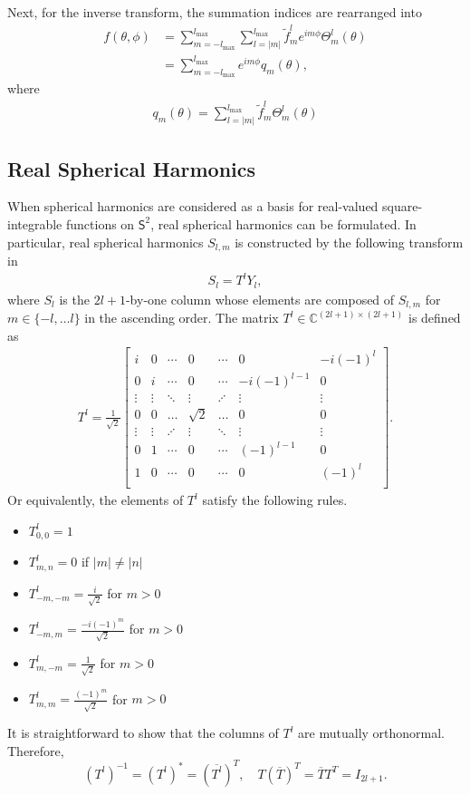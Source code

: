 \documentclass[onecolumn,11pt]{IEEEtran}
\newcommand{\Cp}{\ensuremath{\mathbb{C}}}
\newcommand{\Sph}{\ensuremath{\mathsf{S}}}
\begin{document}
Next, for the inverse transform, the summation indices are rearranged into
\begin{align*}
    f(\theta,\phi) & = \sum_{m=-l_{\max}}^{l_{\max}} \sum_{l=|m|}^{l_{\max}} \tilde f^l_m e^{im\phi} \Theta^l_m(\theta)\\
                   & = \sum_{m=-l_{\max}}^{l_{\max}} e^{im\phi} q_m(\theta),
\end{align*}
where
\begin{align*}
    q_m(\theta ) = \sum_{l=|m|}^{l_{\max}} \tilde f^l_m  \Theta^l_m(\theta)
\end{align*}

\subsection{Real Spherical Harmonics}

When spherical harmonics are considered as a basis for real-valued square-integrable functions on $\Sph^2$, real spherical harmonics can be formulated. 
In particular, real spherical harmonics $S_{l,m}$ is constructed by the following transform in~\cite{BlaFloJMS97}
\begin{align}
    S_l = T^l Y_l,\label{eqn:YtoS}
\end{align}
where $S_l$ is the $2l+1$-by-one column whose elements are composed of $S_{l,m}$ for $m\in\{-l,\ldots l\}$ in the ascending order. 
The matrix $T^l\in\Cp^{(2l+1)\times(2l+1)}$ is defined as
\begin{align*}
    T^l=\frac{1}{\sqrt{2}}
    \begin{bmatrix}
        i & 0 & \cdots & 0 & \cdots & 0 & -i(-1)^l\\
        0 & i & \cdots & 0 & \cdots & -i(-1)^{l-1} & 0 \\
        \vdots & \vdots & \ddots &\vdots & \iddots & \vdots & \vdots\\
        0 & 0 & \hdots & \sqrt{2} & \hdots & 0 & 0 \\
        \vdots & \vdots & \iddots &\vdots & \ddots & \vdots & \vdots\\
        0 & 1 & \cdots & 0 & \cdots & (-1)^{l-1} & 0 \\
        1 & 0 & \cdots & 0 & \cdots & 0 & (-1)^l\\
    \end{bmatrix}.
\end{align*}
Or equivalently, the elements of $T^l$ satisfy the following rules.
\begin{itemize}
    \item $T^l_{0,0}=1$
    \item $T^l_{m,n}=0$ if $|m|\neq|n|$
    \item $T^l_{-m,-m} = \frac{i}{\sqrt{2}}$ for $m>0$
    \item $T^l_{-m,m}=\frac{-i(-1)^m}{\sqrt{2}}$ for $m>0$
    \item $T^l_{m,-m}=\frac{1}{\sqrt{2}}$ for $m>0$
    \item $T^l_{m,m}=\frac{(-1)^m}{\sqrt{2}} $ for $m>0$
\end{itemize}
It is straightforward to show that the columns of $T^l$ are mutually orthonormal. 
Therefore,
\[
    (T^l)^{-1} = (T^l)^* = (\overline{T^l})^T,\quad T (\overline T)^T= \overline{T} T^T = I_{2l+1}.
\]
\end{document}

